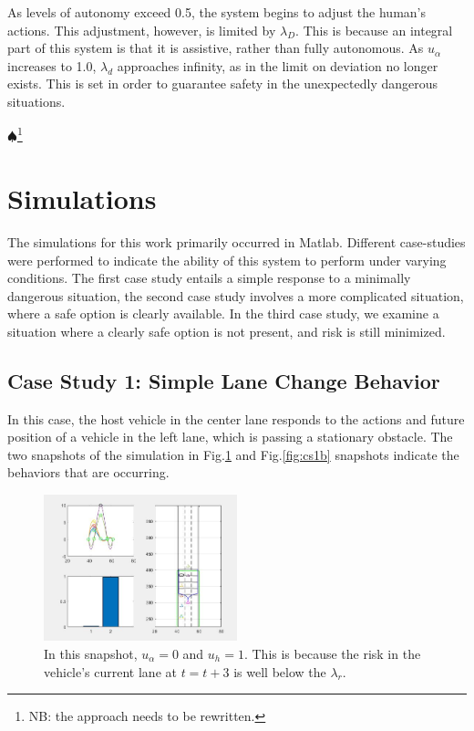 \documentclass[conference]{IEEEtran}
\newcommand\NB[1]{$\spadesuit$\footnote{NB: #1}}
\begin{document}
As levels of autonomy exceed 0.5, the system begins to adjust the human's actions. This adjustment, however, is limited by $\lambda_{D}$. This is because an integral part of this system is that it is assistive, rather than fully autonomous. As $u_{\alpha}$ increases to 1.0, $\lambda_{d}$ approaches infinity, as in the limit on deviation no longer exists. This is set in order to guarantee safety in the unexpectedly dangerous situations.

\NB{the approach needs to be rewritten.}


\section{Simulations}
The simulations for this work primarily occurred in Matlab. Different case-studies were performed to indicate the ability of this system to perform under varying conditions. The first case study entails a simple response to a minimally dangerous situation, the second case study involves a more complicated situation, where a safe option is clearly available. In the third case study, we examine a situation where a clearly safe option is not present, and risk is still minimized.
\subsection{Case Study 1: Simple Lane Change Behavior}
In this case, the host vehicle in the center lane responds to the actions and future position of a vehicle in the left lane, which is passing a stationary obstacle. The two snapshots of the simulation in Fig.\ref{fig:cs1} and Fig.\ref{fig:cs1b} snapshots indicate the behaviors that are occurring.

\begin{figure}[ht]
    \includegraphics[width=0.5\textwidth]{cs1.JPG}
    \caption{In this snapshot, $u_{\alpha} = 0$ and $u_{h} = 1$. This is because the risk in the vehicle's current lane at $t = t+3$ is well below the $\lambda_{r}$.}
    \label{fig:cs1}
\end{figure}
\end{document}
